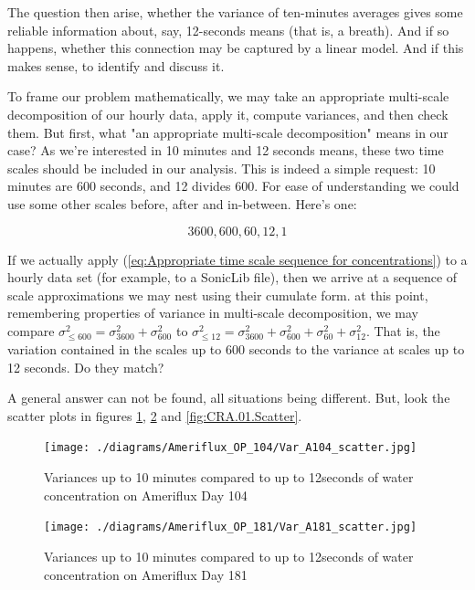 \documentclass[a4paper,10pt]{book}
\begin{document}
The question then arise, whether the variance of ten-minutes averages gives some reliable information about, say, 12-seconds means (that is, a breath). And if so happens, whether this connection may be captured by a linear model. And if this makes sense, to identify and discuss it.

To frame our problem mathematically, we may take an appropriate multi-scale decomposition of our hourly data, apply it, compute variances, and then check them. But first, what "an appropriate multi-scale decomposition" means in our case? As we're interested in 10 minutes and 12 seconds means, these two time scales should be included in our analysis. This is indeed a simple request: 10 minutes are 600 seconds, and 12 divides 600. For ease of understanding we could use some other scales before, after and in-between. Here's one:

\begin{equation}\label{eq:Appropriate time scale sequence for concentrations}
	3600, 600, 60, 12, 1
\end{equation}

If we actually apply (\ref{eq:Appropriate time scale sequence for concentrations}) to a hourly data set (for example, to a SonicLib file), then we arrive at a sequence of scale approximations we may nest using their cumulate form. at this point, remembering properties of variance in multi-scale decomposition, we may compare $\sigma_{\le 600}^{2} = \sigma_{3600}^{2} + \sigma_{600}^{2}$ to $\sigma_{\le 12}^{2} = \sigma_{3600}^{2} + \sigma_{600}^{2} + \sigma_{60}^{2} + \sigma_{12}^{2}$. That is, the variation contained in the scales up to 600 seconds to the variance at scales up to 12 seconds. Do they match?

A general answer can not be found, all situations being different. But, look the scatter plots in figures \ref{fig:Ame.104.Scatter}, \ref{fig:Ame.181.Scatter} and \ref{fig:CRA.01.Scatter}.

\begin{figure}[htp]
 \centering
 \begin{center}
 \texttt{[image: ./diagrams/Ameriflux\_OP\_104/Var\_A104\_scatter.jpg]}
 \end{center}
 \caption{Variances up to 10 minutes compared to up to 12seconds of water concentration on Ameriflux Day 104}
 \label{fig:Ame.104.Scatter}
\end{figure}

\begin{figure}[htp]
 \centering
 \begin{center}
 \texttt{[image: ./diagrams/Ameriflux\_OP\_181/Var\_A181\_scatter.jpg]}
 \end{center}
 \caption{Variances up to 10 minutes compared to up to 12seconds of water concentration on Ameriflux Day 181}
 \label{fig:Ame.181.Scatter}
\end{figure}
\end{document}
